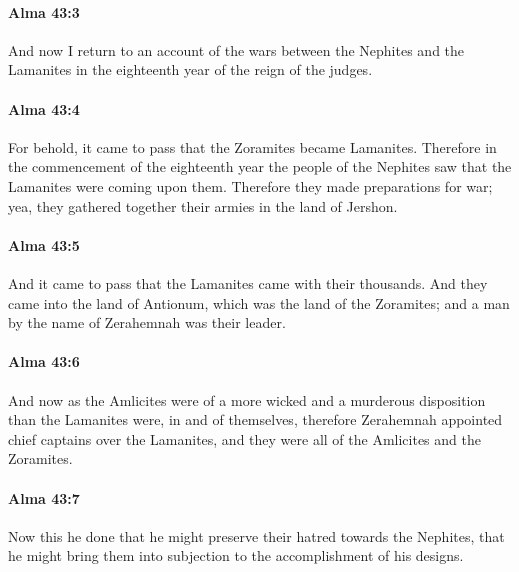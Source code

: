 		\paragraph{Alma 43:3} %
			\label{ALMA-43-3}

			And now I return to an account of the wars
			between the Nephites and the Lamanites
			in the eighteenth year of the reign of the judges.

		\paragraph{Alma 43:4} %
			\label{ALMA-43-4}

			For behold, it came to pass that the Zoramites became Lamanites.
			Therefore in the commencement of the eighteenth year
			the people of the Nephites saw that the Lamanites were coming upon them.
			Therefore they made preparations for war;
			yea, they gathered together their armies in the land of Jershon.

		\paragraph{Alma 43:5} %
			\label{ALMA-43-5}

			And it came to pass that the Lamanites came with their thousands.
			And they came into the land of Antionum,
			which was the land of the Zoramites;
			and a man by the name of Zerahemnah was their leader.

		\paragraph{Alma 43:6} %
			\label{ALMA-43-6}

			And now as the Amlicites were of a more wicked and a murderous disposition
			than the Lamanites were, in and of themselves,
			therefore Zerahemnah appointed chief captains over the Lamanites,
			and they were all of the Amlicites and the Zoramites.

		\paragraph{Alma 43:7} %
			\label{ALMA-43-7}

			Now this he done that he might preserve their hatred towards the Nephites,
			that he might bring them into subjection to the accomplishment of his designs.

